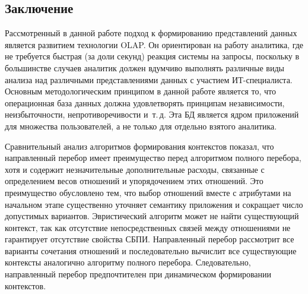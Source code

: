 \begin{multicols}{2}
\section{Заключение}

  Рассмотренный в данной работе подход к формированию представлений 
данных является развитием технологии OLAP. Он ориентирован на работу 
аналитика, где не требуется быстрая (за доли секунд) реакция системы на 
запросы, поскольку в большинстве случаев аналитик должен вдумчиво 
выполнять различные виды анализа над различными представлениями данных с 
участием ИТ-спе\-ци\-а\-лис\-та. Основным методологическим принципом в данной 
работе является то, что операционная база данных должна удовлетворять 
принципам независимости, неизбыточности, непротиворечивости и~т.\,д. Эта 
БД является ядром приложений для множества пользователей, а не только для 
отдельно взятого аналитика.
  
  Сравнительный анализ алгоритмов формирования контекстов показал, что 
направленный перебор имеет преимущество перед алгоритмом полного 
перебора, хотя и содержит незначительные дополнительные расходы, 
связанные с определением весов отношений и упорядочением этих отношений. 
Это преимущество обусловлено тем, что выбор отношений вместе с атрибутами 
на начальном этапе существенно уточняет семантику приложения и сокращает 
число допустимых вариантов. Эвристический алгоритм может не найти 
существующий контекст, так как отсутствие непосредственных связей между 
отношениями не гарантирует отсутствие свойства СБПИ. Направленный 
перебор рассмотрит все варианты сочетания отношений и последовательно 
вычислит все существующие контексты аналогично алгоритму полного 
перебора. Следовательно, направленный перебор предпочтителен при 
динамическом формировании контекстов.
  
{\small\frenchspacing
{%
\begin{thebibliography}{99}


\end{thebibliography}}}
\end{multicols}
